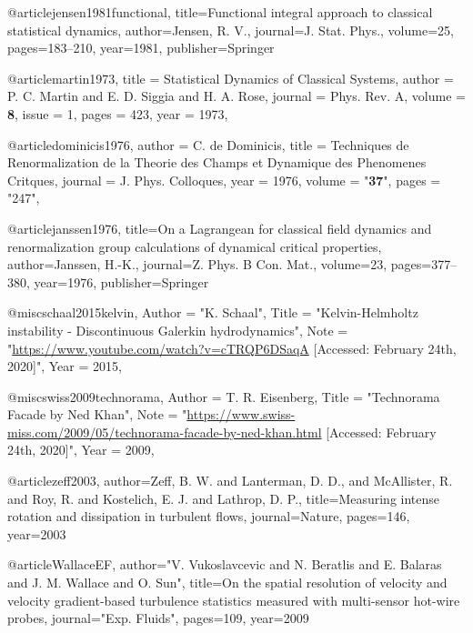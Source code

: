   @article{jensen1981functional,
    title={{Functional integral approach to classical statistical dynamics}},
    author={Jensen, R. V.},
    journal={J. Stat. Phys.},
    volume={25},
    pages={183--210},
    year={1981},
    publisher={Springer}
  }

  @article{martin1973,
    title = {{Statistical Dynamics of Classical Systems}},
    author = {P. C. Martin and E. D. Siggia and H. A. Rose},
    journal = {Phys. Rev. A},
    volume = {\textbf{8}},
    issue = {1},
    pages = {423},
    year = 1973,
  }

  @article{dominicis1976,
    author = {C. de Dominicis},
    title = {{Techniques de Renormalization de la Theorie des Champs et Dynamique des Phenomenes Critques}},
    journal = {J. Phys. Colloques},
    year = 1976,
    volume = "\textbf{37}",
    pages = "247",
  }

  @article{janssen1976,
  title={{On a Lagrangean for classical field dynamics and renormalization group calculations of dynamical critical properties}},
  author={Janssen, H.-K.},
  journal={Z. Phys. B Con. Mat.},
  volume={23},
  pages={377--380},
  year={1976},
  publisher={Springer}
  }


  @misc{schaal2015kelvin,
    Author = "K. Schaal",
    Title  = "Kelvin-Helmholtz instability - Discontinuous Galerkin hydrodynamics",
    Note   = "\url{https://www.youtube.com/watch?v=cTRQP6DSaqA}
             [Accessed: February 24th, 2020]",
    Year   = 2015,
  }

  @misc{swiss2009technorama,
    Author = {T. R. Eisenberg},
    Title  = "Technorama Facade by Ned Khan",
    Note   = "\url{https://www.swiss-miss.com/2009/05/technorama-facade-by-ned-khan.html}
             [Accessed: February 24th, 2020]",
    Year   = 2009,
  }


  @article{zeff2003,
   author={Zeff, B. W. and Lan\-ter\-man, D. D., and Mc\-A\-llis\-ter, R. and Roy, R. and Kos\-te\-lich, E. J. and La\-throp, D. P.},
   title={{Measuring intense rotation and dissipation in turbulent flows}},
   journal={Nature},
   pages=146,
   year=2003
  }

  @article{WallaceEF,
   author="V. Vukoslavcevic and N. Beratlis and E. Balaras and J. M. Wallace and O. Sun",
   title={{On the spatial resolution of velocity and velocity gradient-based turbulence statistics measured with multi-sensor hot-wire probes}},
   journal="Exp. Fluids",
   pages=109,
   year=2009
  }

